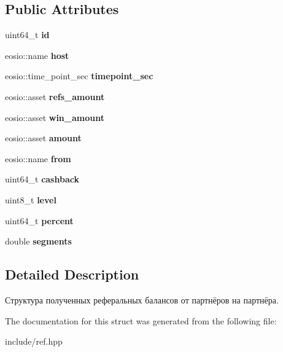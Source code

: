 \subsection*{Public Attributes}
\begin{DoxyCompactItemize}
\item 
\mbox{\label{structrefbalances_a34a8a9d5c56b24de0829d4a9d81c4269}} 
uint64\+\_\+t {\bfseries id}
\item 
\mbox{\label{structrefbalances_a0d55b785c080f4d6dc43b61e989b36ae}} 
eosio\+::name {\bfseries host}
\item 
\mbox{\label{structrefbalances_a760220fca952e44324bec6c283d78508}} 
eosio\+::time\+\_\+point\+\_\+sec {\bfseries timepoint\+\_\+sec}
\item 
\mbox{\label{structrefbalances_adb665594bda054dc09fb0a19ce7c624e}} 
eosio\+::asset {\bfseries refs\+\_\+amount}
\item 
\mbox{\label{structrefbalances_ac23a0a9c62f64db74bd819d837e21508}} 
eosio\+::asset {\bfseries win\+\_\+amount}
\item 
\mbox{\label{structrefbalances_a2a19cbf0c5c081f639f1d49f9015d9da}} 
eosio\+::asset {\bfseries amount}
\item 
\mbox{\label{structrefbalances_a4b7c4278ee25e6b06217d6344e492811}} 
eosio\+::name {\bfseries from}
\item 
\mbox{\label{structrefbalances_a4d987f9d8ae123989bd1b24c03452f5e}} 
uint64\+\_\+t {\bfseries cashback}
\item 
\mbox{\label{structrefbalances_aa19c983f2588d068b82d315d45704f10}} 
uint8\+\_\+t {\bfseries level}
\item 
\mbox{\label{structrefbalances_a9a1457ff6e68a73c515e3ac5ab61016b}} 
uint64\+\_\+t {\bfseries percent}
\item 
\mbox{\label{structrefbalances_ab1acdfa60be29ef313f41b864539f98c}} 
double {\bfseries segments}
\end{DoxyCompactItemize}


\subsection{Detailed Description}
Структура полученных реферальных балансов от партнёров на партнёра. 

The documentation for this struct was generated from the following file\+:\begin{DoxyCompactItemize}
\item 
include/ref.\+hpp\end{DoxyCompactItemize}
